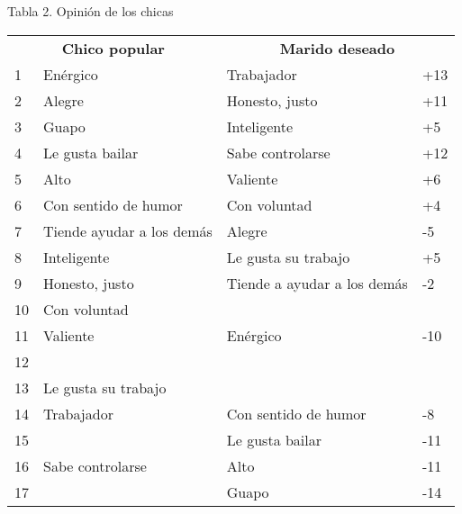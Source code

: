\begin{table}[]
\centering
Tabla 2. Opinión de los chicas
\label{my-label}
\begin{tabular}{llll}
\multicolumn{2}{c}{\textbf{Chico popular}} & \multicolumn{2}{c}{\textbf{Marido deseado}} \\
1        & Enérgico                        & Trabajador                       & +13      \\
2        & Alegre                          & Honesto, justo                   & +11      \\
3        & Guapo                           & Inteligente                      & +5       \\
4        & Le gusta bailar                 & Sabe controlarse                 & +12      \\
5        & Alto                            & Valiente                         & +6       \\
6        & Con sentido de humor            & Con voluntad                     & +4       \\
7        & Tiende ayudar a los demás       & Alegre                           & -5       \\
8        & Inteligente                     & Le gusta su trabajo              & +5       \\
9        & Honesto, justo                  & Tiende a ayudar a los demás      & -2       \\
10       & Con voluntad                    &                                  &          \\
11       & Valiente                        & Enérgico                         & -10      \\
12       &                                 &                                  &          \\
13       & Le gusta su trabajo             &                                  &          \\
14       & Trabajador                      & Con sentido de humor             & -8       \\
15       &  &  Le gusta bailar	                                  &          -11 \\
16       &  Sabe controlarse	& Alto                                  & -11          \\
17       &  & Guapo                                  & -14          

\end{tabular}
\end{table}


